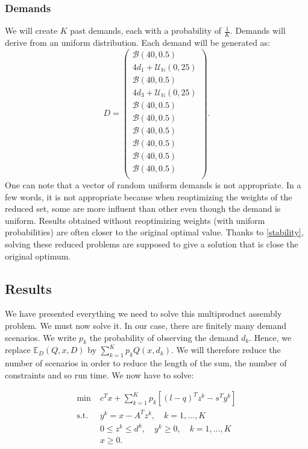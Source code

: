 \documentclass{amsart}
\begin{document}
\subsubsection{Demands}
We will create $K$ past demands, each with a probability of $\frac{1}{K}$. Demands will derive from an uniform distribution. Each demand will be generated as:
$$
D = \begin{pmatrix} \mathcal{B}\left(40,0.5\right) \\ 4d_1 + \mathcal{U}_\mathbb{N}\left(0,25\right)
  \\ \mathcal{B}\left(40,0.5\right) \\ 4d_3 + \mathcal{U}_\mathbb{N}\left(0,25\right)
  \\ \mathcal{B}\left(40,0.5\right) \\ \mathcal{B}\left(40,0.5\right) \\ \mathcal{B}\left(40,0.5\right) \\ \mathcal{B}\left(40,0.5\right) \\ \mathcal{B}\left(40,0.5\right) \\ \mathcal{B}\left(40,0.5\right) \\ \end{pmatrix}.
$$
One can note that a vector of random uniform demands is not appropriate. In a few words, it is not appropriate because when reoptimizing the weights of the reduced set, some are more influent than other even though the demand is uniform. Results obtained without reoptimizing weights (with uniform probabilities) are often closer to the original optimal value. Thanks to \ref{stability}, solving these reduced problems are supposed to give a solution that is close the original optimum.

\subsection{Results}
We have presented everything we need to solve this multiproduct assembly problem. We must now solve it. In our case, there are finitely many demand scenarios. We write $p_k$ the probability of observing the demand $d_k$. Hence, we replace $\mathbb{E}_D\left(Q,x,D\right)$ by $\sum_{k=1}^Kp_kQ\left(x,d_k\right)$. We will therefore reduce the number of scenarios in order to reduce the length of the sum, the number of constraints and so run time. We now have to solve:

\begin{equation}\label{LP}
\begin{aligned}
    \min\; &c^Tx + \sum_{k=1}^{K} p_k \left[ (l - q)^T z^k - s^T y^k \right] \\
    \text{s.t. } & y^k = x - A^T z^k, \quad k = 1, \ldots, K \\
    & 0 \leq z^k \leq d^k, \quad y^k \geq 0, \quad k = 1, \ldots, K \\
    & x \geq 0.
\end{aligned}
\end{equation}
\end{document}
